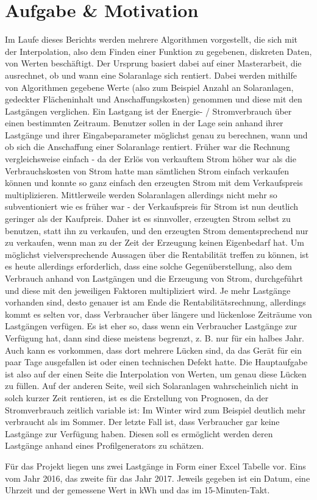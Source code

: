 
\section{Aufgabe \& Motivation}

Im Laufe dieses Berichts werden mehrere Algorithmen vorgestellt, die sich mit der Interpolation, also dem Finden einer Funktion zu gegebenen, diskreten Daten, von Werten beschäftigt. Der Ursprung basiert dabei auf einer Masterarbeit, die ausrechnet, ob und wann eine Solaranlage sich rentiert. Dabei werden mithilfe von Algorithmen gegebene Werte (also zum Beispiel Anzahl an Solaranlagen, gedeckter Flächeninhalt und Anschaffungskosten) genommen und diese mit den Lastgängen verglichen. Ein Lastgang ist der Energie- / Stromverbrauch über einen bestimmten Zeitraum. Benutzer sollen in der Lage sein anhand ihrer Lastgänge und ihrer Eingabeparameter möglichst genau zu berechnen, wann und ob sich die Anschaffung einer Solaranlage rentiert. Früher war die Rechnung vergleichsweise einfach - da der Erlös von verkauftem Strom höher war als die Verbrauchskosten von Strom hatte man sämtlichen Strom einfach verkaufen können und konnte so ganz einfach den erzeugten Strom mit dem Verkaufspreis multiplizieren. Mittlerweile werden Solaranlagen allerdings nicht mehr so subventioniert wie es früher war - der Verkaufspreis für Strom ist nun deutlich geringer als der Kaufpreis. Daher ist es sinnvoller, erzeugten Strom selbst zu benutzen, statt ihn zu verkaufen, und den erzeugten Strom dementsprechend nur zu verkaufen, wenn man zu der Zeit der Erzeugung keinen Eigenbedarf hat. Um möglichst vielversprechende Aussagen über die Rentabilität treffen zu können, ist es heute allerdings erforderlich, dass eine solche Gegenüberstellung, also dem Verbrauch anhand von Lastgängen und die Erzeugung von Strom, durchgeführt und diese mit den jeweiligen Faktoren multipliziert wird. Je mehr Lastgänge vorhanden sind, desto genauer ist am Ende die Rentabilitätsrechnung, allerdings kommt es selten vor, dass Verbraucher über längere und lückenlose Zeiträume von Lastgängen verfügen. Es ist eher so, dass wenn ein Verbraucher Lastgänge zur Verfügung hat, dann sind diese meistens begrenzt, z. B. nur für ein halbes Jahr. Auch kann es vorkommen, dass dort mehrere Lücken sind, da das Gerät für ein paar Tage ausgefallen ist oder einen technischen Defekt hatte. Die Hauptaufgabe ist also auf der einen Seite die Interpolation von Werten, um genau diese Lücken zu füllen. Auf der anderen Seite, weil sich Solaranlagen wahrscheinlich nicht in solch kurzer Zeit rentieren, ist es die Erstellung von Prognosen, da der Stromverbrauch zeitlich variable ist: Im Winter wird zum Beispiel deutlich mehr verbraucht als im Sommer. Der letzte Fall ist, dass Verbraucher gar keine Lastgänge zur Verfügung haben. Diesen soll es ermöglicht werden deren Lastgänge anhand eines Profilgenerators zu schätzen.

Für das Projekt liegen uns zwei Lastgänge in Form einer Excel Tabelle vor. Eins vom Jahr 2016, das zweite für das Jahr 2017. Jeweils gegeben ist ein Datum, eine Uhrzeit und der gemessene Wert in kWh und das im 15-Minuten-Takt.